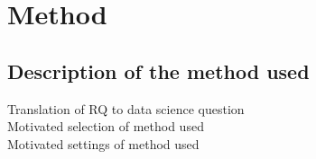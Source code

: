 

\chapter{Method}
\label{chap:method}
\pagestyle{fancy}

\section{Description of the method used}
Translation of RQ to data science question \\
Motivated selection of method used\\
Motivated settings of method used \\